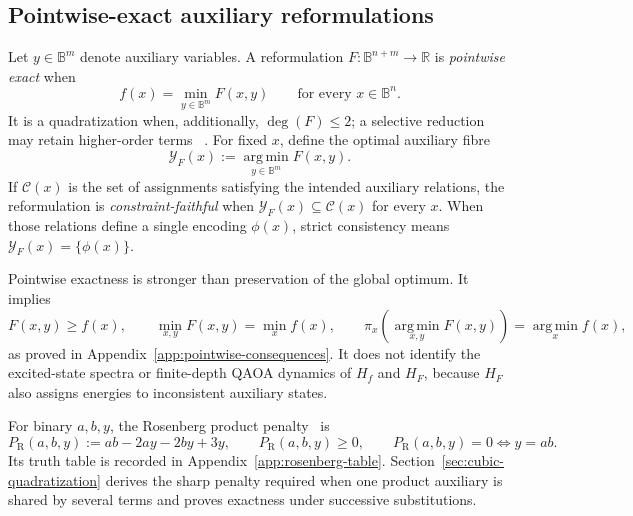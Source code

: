 \documentclass[a4paper,onecolumn,11pt,unpublished]{quantumarticle}
\theoremstyle{remark}
\begin{document}
\subsection{Pointwise-exact auxiliary reformulations}
\label{sec:pointwise-exactness}

Let \(y\in\mathbb{B}^m\) denote auxiliary variables.  A reformulation
\(F:\mathbb{B}^{n+m}\to\mathbb{R}\) is \emph{pointwise exact} when
\begin{equation}
  f(x)=\min_{y\in\mathbb{B}^m}F(x,y)
  \qquad\text{for every }x\in\mathbb{B}^n.
  \label{eq:pointwise-exactness}
\end{equation}
It is a quadratization when, additionally, \(\deg(F)\leq2\); a selective
reduction may retain higher-order terms
~\cite{BorosGruber2014,AnthonyEtAl2017,CramaEtAl2025}.  For fixed \(x\), define
the optimal auxiliary fibre
\begin{equation}
  \mathcal{Y}_F(x):=\operatorname*{arg\,min}_{y\in\mathbb{B}^m}F(x,y).
  \label{eq:optimal-fibre}
\end{equation}
If \(\mathcal{C}(x)\) is the set of assignments satisfying the intended
auxiliary relations, the reformulation is \emph{constraint-faithful} when
\(\mathcal{Y}_F(x)\subseteq\mathcal{C}(x)\) for every \(x\).  When those
relations define a single encoding \(\phi(x)\), strict consistency means
\(\mathcal{Y}_F(x)=\{\phi(x)\}\).

Pointwise exactness is stronger than preservation of the global optimum.  It
implies
\begin{equation}
  F(x,y)\geq f(x),
  \qquad
  \min_{x,y}F(x,y)=\min_x f(x),
  \qquad
  \pi_x\!\left(\operatorname*{arg\,min}_{x,y}F(x,y)\right)
  =\operatorname*{arg\,min}_x f(x),
  \label{eq:pointwise-consequences}
\end{equation}
as proved in Appendix~\ref{app:pointwise-consequences}.  It does not identify
the excited-state spectra or finite-depth QAOA dynamics of \(H_f\) and \(H_F\),
because \(H_F\) also assigns energies to inconsistent auxiliary states.

For binary \(a,b,y\), the Rosenberg product penalty~\cite{Rosenberg1975} is
\begin{equation}
  P_{\mathrm R}(a,b,y):=ab-2ay-2by+3y,
  \qquad
  P_{\mathrm R}(a,b,y)\geq0,
  \qquad
  P_{\mathrm R}(a,b,y)=0\iff y=ab.
  \label{eq:rosenberg}
\end{equation}
Its truth table is recorded in Appendix~\ref{app:rosenberg-table}.
Section~\ref{sec:cubic-quadratization}
derives the sharp penalty required when one product auxiliary is shared by
several terms and proves exactness under successive substitutions.
\end{document}
